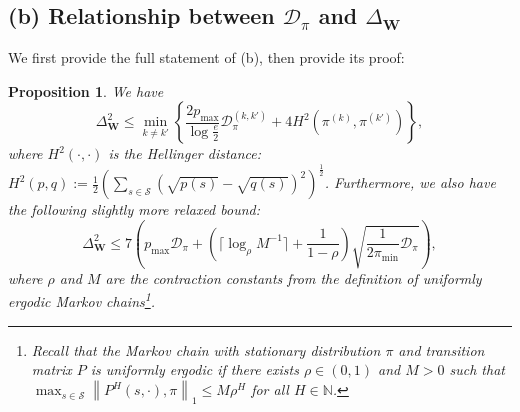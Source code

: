 \documentclass[twoside]{article}
\providecommand{\ceil}[2][-1]{
\ensuremath{\mathinner{
\ifthenelse{\equal{#1}{-1}}{ %
\!\left\lceil#2\right\rceil}{}
\ifthenelse{\equal{#1}{0}}{ %
\lceil#2\rceil}{}
\ifthenelse{\equal{#1}{1}}{ %
\!\bigl\lceil#2\bigr\rceil}{}
\ifthenelse{\equal{#1}{2}}{ %
\!\Bigl\lceil#2\Bigr\rceil}{}
\ifthenelse{\equal{#1}{3}}{ %
\!\biggl\lceil#2\biggr\rceil}{}
\ifthenelse{\equal{#1}{4}}{ %
\!\Biggl\lceil#2\Biggr\rceil}{}
}} %
}
\def\mW{{\bm{W}}}
\def\gD{{\mathcal{D}}}
\def\gS{{\mathcal{S}}}
\def\sN{{\mathbb{N}}}
\theoremstyle{plain}
\newtheorem{proposition}{Proposition}[section]
\def\ceil#1{\lceil #1 \rceil}
\def\bignorm#1{\left\lVert #1 \right\rVert}
\begin{document}
\subsection{\texorpdfstring{(b) Relationship between $\gD_\pi$ and $\Delta_{\mathbf{W}}$}{(a) Relationship between KL-based Separation and our L2-based Separation}}
We first provide the full statement of (b), then provide its proof:
\begin{proposition}
\label{prop:DeltaW-Dpi}
    We have
    \begin{equation}
        \Delta_\mW^2 \leq \min_{k \neq k'} \left\{ \frac{2 p_{\max}}{\log \frac{e}{2}} \gD_\pi^{(k,k')} + 4 H^2\left( \pi^{(k)}, \pi^{(k')} \right) \right\},
    \end{equation}
    where $H^2(\cdot, \cdot)$ is the Hellinger distance: $H^2(p, q) := \frac{1}{2} \left( \sum_{s \in \gS} (\sqrt{p(s)} - \sqrt{q(s)})^2 \right)^{\frac{1}{2}}$.
    Furthermore, we also have the following slightly more relaxed bound:
    \begin{equation}
        \Delta_\mW^2 \leq 7 \left( p_{\max} \gD_\pi + \left( \ceil{\log_\rho M^{-1}} + \frac{1}{1 - \rho} \right) \sqrt{\frac{1}{2 \pi_{\min}} \gD_\pi} \right),
    \end{equation}
    where $\rho$ and $M$ are the contraction constants from the definition of uniformly ergodic Markov chains\footnote{Recall that the Markov chain with stationary distribution $\pi$ and transition matrix $P$ is uniformly ergodic if there exists $\rho \in (0, 1)$ and $M > 0$ such that $\max_{s \in \gS} \bignorm{P^H(s, \cdot), \pi}_1 \leq M \rho^H$ for all $H \in \sN$.}.
\end{proposition}
\end{document}
